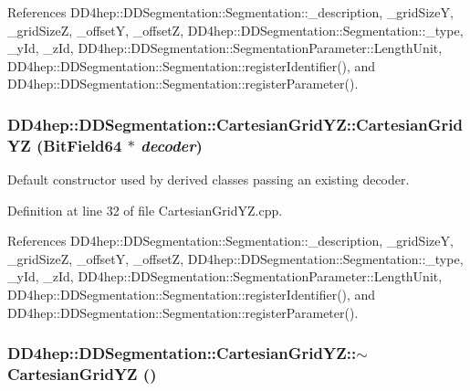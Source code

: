 References DD4hep::DDSegmentation::Segmentation::\_\-description, \_\-gridSizeY, \_\-gridSizeZ, \_\-offsetY, \_\-offsetZ, DD4hep::DDSegmentation::Segmentation::\_\-type, \_\-yId, \_\-zId, DD4hep::DDSegmentation::SegmentationParameter::LengthUnit, DD4hep::DDSegmentation::Segmentation::registerIdentifier(), and DD4hep::DDSegmentation::Segmentation::registerParameter().\hypertarget{class_d_d4hep_1_1_d_d_segmentation_1_1_cartesian_grid_y_z_a9f4c387d36c1ce52d40f7eb85618c6fd}{
\subsubsection[{CartesianGridYZ}]{\setlength{\rightskip}{0pt plus 5cm}DD4hep::DDSegmentation::CartesianGridYZ::CartesianGridYZ ({\bf BitField64} $\ast$ {\em decoder})}}
\label{class_d_d4hep_1_1_d_d_segmentation_1_1_cartesian_grid_y_z_a9f4c387d36c1ce52d40f7eb85618c6fd}


Default constructor used by derived classes passing an existing decoder. 

Definition at line 32 of file CartesianGridYZ.cpp.

References DD4hep::DDSegmentation::Segmentation::\_\-description, \_\-gridSizeY, \_\-gridSizeZ, \_\-offsetY, \_\-offsetZ, DD4hep::DDSegmentation::Segmentation::\_\-type, \_\-yId, \_\-zId, DD4hep::DDSegmentation::SegmentationParameter::LengthUnit, DD4hep::DDSegmentation::Segmentation::registerIdentifier(), and DD4hep::DDSegmentation::Segmentation::registerParameter().\hypertarget{class_d_d4hep_1_1_d_d_segmentation_1_1_cartesian_grid_y_z_a79289b0fc6f6ff298284ac1bb2266c79}{
\subsubsection[{$\sim$CartesianGridYZ}]{\setlength{\rightskip}{0pt plus 5cm}DD4hep::DDSegmentation::CartesianGridYZ::$\sim$CartesianGridYZ ()}}
\label{class_d_d4hep_1_1_d_d_segmentation_1_1_cartesian_grid_y_z_a79289b0fc6f6ff298284ac1bb2266c79}


